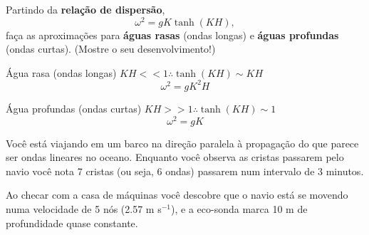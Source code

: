 \documentclass[letterpaper,portuguese,12pt,pdftex]{exam}
\begin{document}
\begin{questions}
\question[4]
Partindo da {\bf relação de dispersão},
\[
  \omega^2 = gK\tanh(KH),
\]
faça as aproximações para {\bf águas rasas} (ondas longas) e {\bf águas
profundas} (ondas curtas). (Mostre o seu desenvolvimento!)

\begin{solution}
\raggedright
      Água rasa (ondas longas) $KH << 1 \therefore \tanh(KH) \sim KH$\\
      \[
        \omega^2 = gK^2H
      \]

      Água profundas (ondas curtas) $KH >> 1 \therefore \tanh(KH) \sim 1$\\
      \[
        \omega^2 = gK
      \]
  \end{solution}

\question
Você está viajando em um barco na direção paralela à propagação do que parece
ser ondas lineares no oceano.  Enquanto você observa as cristas passarem pelo
navio você nota 7 cristas (ou seja, 6 ondas) passarem num intervalo de 3
minutos.

Ao checar com a casa de máquinas você descobre que o navio está se movendo
numa velocidade de 5 nós (2.57 m s$^{-1}$), e a eco-sonda marca 10 m de profundidade
quase constante.

\end{questions}
\end{document}
